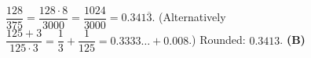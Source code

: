 $\dfrac{128}{375}=\dfrac{128\cdot8}{3000}=\dfrac{1024}{3000}=0.341\overline{3}$. (Alternatively $\dfrac{125+3}{125\cdot3}=\dfrac13+\dfrac1{125}=0.3333\ldots+0.008$.) Rounded: $0.3413$. \textbf{(B)}
